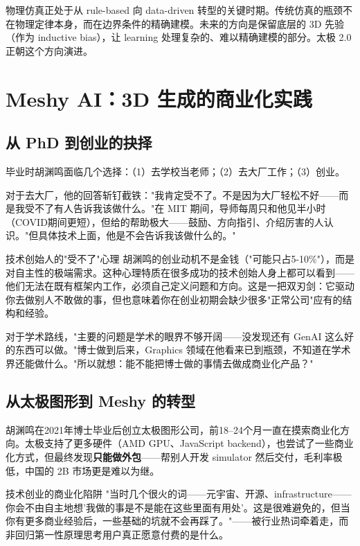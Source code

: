 \documentclass[a4paper]{article}
\begin{document}
物理仿真正处于从 rule-based 向 data-driven 转型的关键时期。传统仿真的瓶颈不在物理定律本身，而在边界条件的精确建模。未来的方向是保留底层的 3D 先验（作为 inductive bias），让 learning 处理复杂的、难以精确建模的部分。太极 2.0 正朝这个方向演进。

\section{Meshy AI：3D 生成的商业化实践}

\subsection{从 PhD 到创业的抉择}

毕业时胡渊鸣面临几个选择：（1）去学校当老师；（2）去大厂工作；（3）创业。

对于去大厂，他的回答斩钉截铁："我肯定受不了。不是因为大厂轻松不好——而是我受不了有人告诉我该做什么。"在 MIT 期间，导师每周只和他见半小时（COVID期间更短），但给的帮助极大——鼓励、方向指引、介绍厉害的人认识。"但具体技术上面，他是不会告诉我该做什么的。"

\begin{knowledgebox}{技术创始人的"受不了"心理}
胡渊鸣的创业动机不是金钱（"可能只占5-10\%"），而是对自主性的极端需求。这种心理特质在很多成功的技术创始人身上都可以看到——他们无法在既有框架内工作，必须自己定义问题和方向。这是一把双刃剑：它驱动你去做别人不敢做的事，但也意味着你在创业初期会缺少很多"正常公司"应有的结构和经验。
\end{knowledgebox}

对于学术路线，"主要的问题是学术的眼界不够开阔——没发现还有 GenAI 这么好的东西可以做。"博士做到后来，Graphics 领域在他看来已到瓶颈，不知道在学术界还能做什么。"所以就想：能不能把博士做的事情去做成商业化产品？"

\subsection{从太极图形到 Meshy 的转型}

胡渊鸣在2021年博士毕业后创立太极图形公司，前18--24个月一直在摸索商业化方向。太极支持了更多硬件（AMD GPU、JavaScript backend），也尝试了一些商业化方式，但最终发现\textbf{只能做外包}——帮别人开发 simulator 然后交付，毛利率极低，中国的 2B 市场更是难以为继。

\begin{warningbox}{技术创业的商业化陷阱}
"当时几个很火的词——元宇宙、开源、infrastructure——你会不由自主地想'我做的事是不是能在这些里面有用处'。这是很难避免的，但当你有更多商业经验后，一些基础的坑就不会再踩了。"——被行业热词牵着走，而非回归第一性原理思考用户真正愿意付费的是什么。
\end{warningbox}
\end{document}
